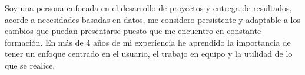 \documentclass[9pt]{developercv} %
\begin{document}

\begin{minipage}[t]{0.4\textwidth} %
	\vspace{-\baselineskip} %
	
	Soy una persona enfocada en el desarrollo de proyectos y entrega de resultados, acorde a necesidades basadas en datos, me considero persistente y adaptable a los cambios que puedan presentarse puesto que me encuentro en constante formación. En más de 4 años de mi experiencia he aprendido la importancia de tener un enfoque centrado en el usuario, el trabajo en equipo y la utilidad de lo que se realice. \\ %
\end{minipage}
\hfill %
\begin{minipage}[t]{0.5\textwidth} %
	\vspace{-\baselineskip} %
	\begin{barchart}{5.5}
	\end{barchart}
\end{minipage}

\begin{center}
\end{center}


\end{document}
